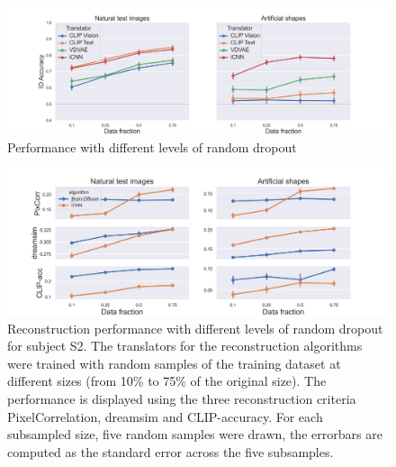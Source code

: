 
\begin{figure}[ht]
    \centering
    \includegraphics[width=1\textwidth]{plots/dropout_random_translator.png}
    \caption[Translator Performance with increasing dropout]{ Performance with different levels of random dropout }\label{fig:dropout_random_translator}
\end{figure}

\begin{figure}[ht]
    \centering
    \includegraphics[width=1\textwidth]{plots/dropout_random_reconstruction.png}
    \caption[Reconstruction Performance with increasing dropout]{Reconstruction performance with different levels of random dropout for subject S2. The translators for the reconstruction algorithms were trained with random samples of the training dataset at different sizes (from 10\% to 75\% of the original size). The performance is displayed using the three reconstruction criteria PixelCorrelation, dreamsim and CLIP-accuracy. For each subsampled size, five random samples were drawn, the errorbars are computed as the standard error across the five subsamples.}\label{fig:dropout_random_reconstruction}
\end{figure}

